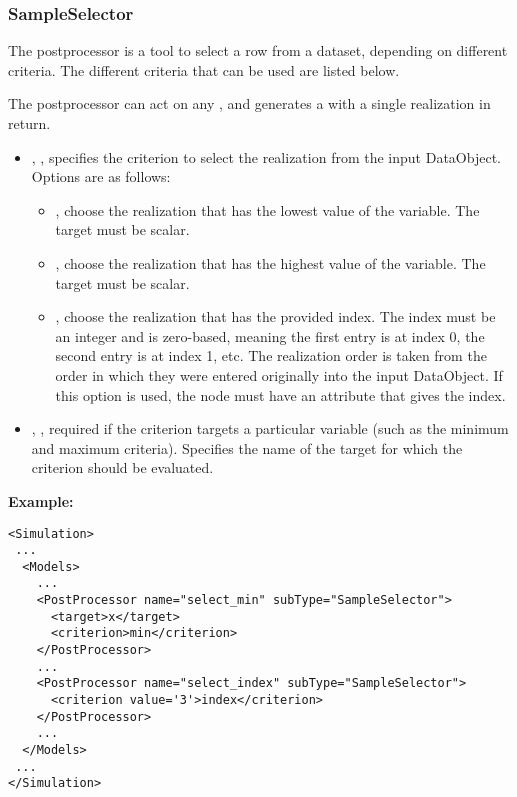 \subsubsection{SampleSelector}
\label{SampleSelectorPP}
The  postprocessor is a tool to select a row from a dataset, depending on different
criteria. The different criteria that can be used are listed below.

The  postprocessor can  act on any , and generates a
 with a single realization in return.

%
\begin{itemize}
  \item {}, , specifies the criterion to select the
    realization from the input DataObject. Options are as follows:
    \begin{itemize}
      \item {}, choose the realization that has the lowest value of the 
        variable. The target must be scalar.
      \item {}, choose the realization that has the highest value of the 
        variable. The target must be scalar.
      \item {}, choose the realization that has the provided index. The index must be an
        integer and is zero-based, meaning the first entry is at index 0, the second entry is at index 1, etc.
        The realization order is taken from the order in which they were entered originally into the input
        DataObject. If this option is used, the  node must have an 
        attribute that gives the index.
    \end{itemize}
  \item {}, , required if the criterion targets a particular
    variable (such as the minimum and maximum criteria). Specifies the name of the
    target for which the criterion should be evaluated.
\end{itemize}

\textbf{Example:}

\begin{lstlisting}[style=XML]
<Simulation>
 ...
  <Models>
    ...
    <PostProcessor name="select_min" subType="SampleSelector">
      <target>x</target>
      <criterion>min</criterion>
    </PostProcessor>
    ...
    <PostProcessor name="select_index" subType="SampleSelector">
      <criterion value='3'>index</criterion>
    </PostProcessor>
    ...
  </Models>
 ...
</Simulation>
\end{lstlisting}
